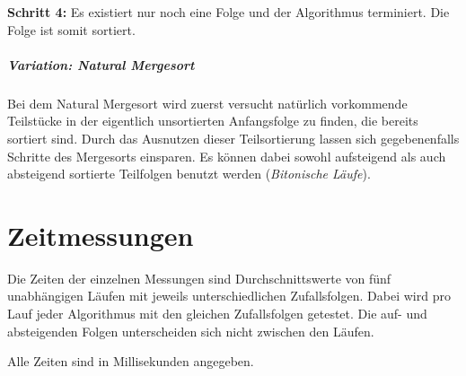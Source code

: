 \documentclass[12pt, a4paper, titlepage, hidelinks]{scrreprt}
\begin{document}
\textbf{Schritt 4:} Es existiert nur noch eine Folge und der Algorithmus terminiert. Die Folge ist somit sortiert.

\paragraph{Variation: Natural Mergesort} Bei dem Natural Mergesort wird zuerst versucht natürlich vorkommende Teilstücke in der eigentlich unsortierten Anfangsfolge zu finden, die bereits sortiert sind. Durch das Ausnutzen dieser Teilsortierung lassen sich gegebenenfalls Schritte des Mergesorts einsparen. Es können dabei sowohl aufsteigend als auch absteigend sortierte Teilfolgen benutzt werden (\textit{Bitonische Läufe}).

\chapter{Zeitmessungen}
Die Zeiten der einzelnen Messungen sind Durchschnittswerte von fünf unabhängigen Läufen mit jeweils unterschiedlichen Zufallsfolgen. Dabei wird pro Lauf jeder Algorithmus mit den gleichen Zufallsfolgen getestet. Die auf- und absteigenden Folgen unterscheiden sich nicht zwischen den Läufen.

Alle Zeiten sind in Millisekunden angegeben.

\clearpage
\pagestyle{empty}
\begin{landscape}

\end{landscape}
\end{document}
